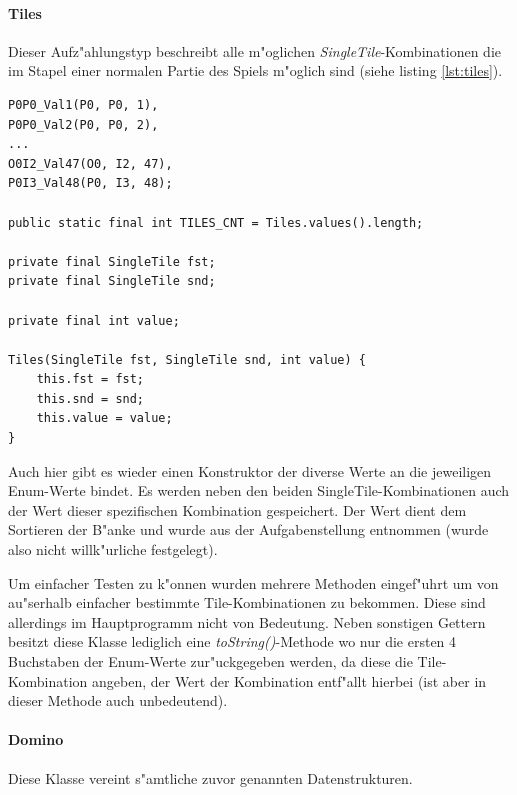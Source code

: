 \paragraph{Tiles}
\label{par:tiles}
Dieser Aufz"ahlungstyp beschreibt alle m"oglichen \emph{SingleTile}-Kombinationen die im Stapel einer normalen Partie des Spiels m"oglich sind (siehe listing \ref{lst:tiles}). 
\begin{lstlisting}[style=CodeHighlighting,float,caption=Tiles,label=lst:tiles]
P0P0_Val1(P0, P0, 1),
P0P0_Val2(P0, P0, 2),
...
O0I2_Val47(O0, I2, 47),
P0I3_Val48(P0, I3, 48);

public static final int TILES_CNT = Tiles.values().length;

private final SingleTile fst;
private final SingleTile snd;

private final int value;

Tiles(SingleTile fst, SingleTile snd, int value) {
    this.fst = fst;
    this.snd = snd;
    this.value = value;
}
\end{lstlisting}
Auch hier gibt es wieder einen Konstruktor der diverse Werte an die jeweiligen Enum-Werte bindet. Es werden neben den beiden SingleTile-Kombinationen auch der Wert dieser spezifischen Kombination gespeichert. Der Wert dient dem Sortieren der B"anke und wurde aus der Aufgabenstellung entnommen (wurde also nicht willk"urliche festgelegt). 

Um einfacher Testen zu k"onnen wurden mehrere Methoden eingef"uhrt um von au"serhalb einfacher bestimmte Tile-Kombinationen zu bekommen. Diese sind allerdings im Hauptprogramm nicht von Bedeutung. Neben sonstigen Gettern besitzt diese Klasse lediglich eine \emph{toString()}-Methode wo nur die ersten 4 Buchstaben der Enum-Werte zur"uckgegeben werden, da diese die Tile-Kombination angeben, der Wert der Kombination entf"allt hierbei (ist aber in dieser Methode auch unbedeutend).


\paragraph{Domino}
\label{par:domino}
Diese Klasse vereint s"amtliche zuvor genannten Datenstrukturen. 

